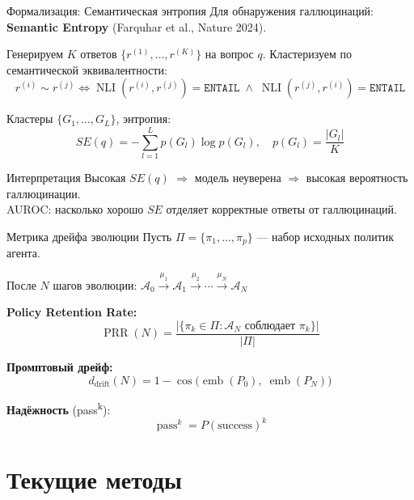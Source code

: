 \documentclass[aspectratio=169, 12pt]{beamer}
\begin{document}
\begin{frame}{Формализация: Семантическая энтропия}
  \small
  Для обнаружения галлюцинаций: \textbf{Semantic Entropy} (Farquhar et al., Nature 2024).

  \vspace{0.15cm}
  Генерируем $K$ ответов $\{r^{(1)}, \ldots, r^{(K)}\}$ на вопрос $q$. Кластеризуем по семантической эквивалентности:
  \[
    r^{(i)} \sim r^{(j)} \iff \operatorname{NLI}(r^{(i)}, r^{(j)}) {=} \texttt{ENTAIL} \;\wedge\; \operatorname{NLI}(r^{(j)}, r^{(i)}) {=} \texttt{ENTAIL}
  \]

  Кластеры $\{G_1, \ldots, G_L\}$, энтропия:
  \[
    \boxed{\;SE(q) = -\sum_{l=1}^{L} p(G_l) \log p(G_l), \quad p(G_l) = \frac{|G_l|}{K}\;}
  \]

  \begin{block}{Интерпретация}
    Высокая $SE(q)$ $\Rightarrow$ модель \textcolor{warnred}{неуверена} $\Rightarrow$ высокая вероятность галлюцинации. \\
    AUROC: насколько хорошо $SE$ отделяет корректные ответы от галлюцинаций.
  \end{block}
\end{frame}

\begin{frame}{Метрика дрейфа эволюции}
  \small
  Пусть $\Pi = \{\pi_1, \ldots, \pi_p\}$ --- набор исходных политик агента.

  \vspace{0.1cm}
  После $N$ шагов эволюции: $\mathcal{A}_0 \xrightarrow{\mu_1} \mathcal{A}_1 \xrightarrow{\mu_2} \cdots \xrightarrow{\mu_N} \mathcal{A}_N$

  \vspace{0.2cm}
  \textbf{Policy Retention Rate:}
  \[
    \boxed{\;\operatorname{PRR}(N) = \frac{|\{\pi_k \in \Pi : \mathcal{A}_N \text{ соблюдает } \pi_k\}|}{|\Pi|}\;}
  \]

  \textbf{Промптовый дрейф:}
  \[
    d_{\text{drift}}(N) = 1 - \cos\bigl(\operatorname{emb}(P_0),\; \operatorname{emb}(P_N)\bigr)
  \]

  \textbf{Надёжность} (pass\textsuperscript{k}):
  \[
    \operatorname{pass}^k = P(\text{success})^k
  \]
\end{frame}

\section{Текущие методы}
\end{document}
